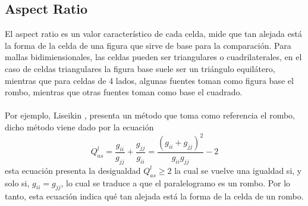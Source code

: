 \documentclass[letterpaper, openright, 12pt]{book}
\begin{document}
    \subsection*{Aspect Ratio}
    El aspect ratio es un valor característico de cada celda, mide que tan
    alejada está la forma de la celda de una figura que sirve de base para
    la comparación. Para mallas bidimiensionales, las celdas pueden ser
    triangulares o cuadrilaterales, en el caso de celdas triangulares la
    figura base suele ser un triángulo equilátero, mientras que para celdas
    de 4 lados, algunas fuentes toman como figura base el rombo, mientras
    que otras fuentes toman como base el cuadrado.

    \paragraph*{}
    Por ejemplo, Liseikin \cite{vladimir-grid}, presenta un método que toma
    como referencia el rombo, dicho método viene dado por la ecuación
    \begin{equation}
        Q_{as}^{l} = \frac{g_{ii}}{g_{jj}} + \frac{g_{jj}}{g_{ii}}
            = \frac{\left( g_{ii} + g_{jj} \right)^2}{g_{ii} g_{jj}} - 2
    \end{equation}
    esta ecuación presenta la desigualdad $Q_{as}^{l} \geq 2$ la cual se
    vuelve una igualdad si, y solo si, $g_{ii} = g_{jj}$, lo cual se traduce
    a que el paralelogramo es un rombo. Por lo tanto, esta ecuación
    indica qué tan alejada está la forma de la celda de un rombo.
\end{document}

